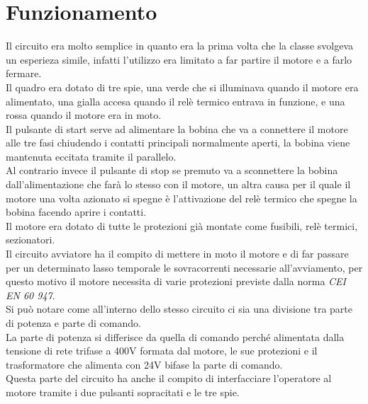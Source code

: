 \documentclass[12pt]{article}
\begin{document}
\section{Funzionamento}
Il circuito era molto semplice in quanto era la prima volta che la classe svolgeva un esperieza simile, infatti l'utilizzo era limitato a far partire il motore e a farlo fermare.\\ 
Il quadro era dotato di tre spie, una verde che si illuminava quando il motore era alimentato, una gialla accesa quando il relè termico entrava in funzione, e una rossa quando il motore era in moto.\\
Il pulsante di start serve ad alimentare la bobina che va a connettere il motore alle tre fasi chiudendo i contatti principali normalmente aperti, la bobina viene mantenuta eccitata tramite il parallelo.\\ 
Al contrario invece il pulsante di stop se premuto va a sconnettere la bobina dall'alimentazione che farà lo stesso con il motore, un altra causa per il quale il motore una volta azionato si spegne è l'attivazione del relè termico che spegne la bobina facendo aprire i contatti.\\
Il motore era dotato di tutte le protezioni già montate come fusibili, relè termici, sezionatori.\\
Il circuito avviatore ha il compito di mettere in moto il motore e di far passare per un determinato lasso temporale le sovracorrenti necessarie all'avviamento, per questo motivo il motore necessita di varie protezioni previste dalla norma \textit{CEI EN 60 947}.\\
Si può notare come all'interno dello stesso circuito ci sia una divisione tra parte di potenza e parte di comando.\\
La parte di potenza si differisce da quella di comando perché alimentata dalla tensione di rete trifase a 400V formata dal motore, le sue protezioni e il trasformatore che alimenta con 24V bifase la parte di comando.\\
Questa parte del circuito ha anche il compito di interfacciare l'operatore al motore tramite i due pulsanti sopracitati e le tre spie.\\
\end{document}
